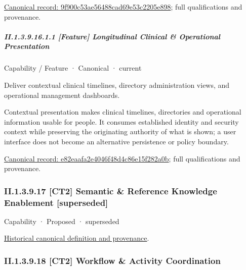 {\footnotesize \href{../../../../continuum/strategy/capability/9f900c53ae56488cad69e53c2205e898.md}{Canonical record: 9f900c53ae56488cad69e53c2205e898}; full qualifications and provenance.}\par
\subparagraph*{II.1.3.9.16.1.1 [Feature] Longitudinal Clinical \& Operational Presentation}
\label{navigation:II.1.3.9.16.1.1}

\label{element:e82eaafa2e4046f48d4c86e15f282a0b}
{\small Capability / Feature · Canonical · current}\par

Deliver contextual clinical timelines, directory administration views, and operational management dashboards.



Contextual presentation makes clinical timelines, directories and operational information usable for people. It consumes established identity and security context while preserving the originating authority of what is shown; a user interface does not become an alternative persistence or policy boundary.


{\footnotesize \href{../../../../continuum/strategy/capability/feature/e82eaafa2e4046f48d4c86e15f282a0b.md}{Canonical record: e82eaafa2e4046f48d4c86e15f282a0b}; full qualifications and provenance.}\par
\subsubsection*{II.1.3.9.17 [CT2] Semantic \& Reference Knowledge Enablement [superseded]}
\label{navigation:II.1.3.9.17}

\label{element:92a71292710c41b29775d19b98c197d6}
{\small Capability · Proposed · superseded}\par
\href{../../../../continuum/strategy/capability/92a71292710c41b29775d19b98c197d6.md}{Historical canonical definition and provenance}.\par
\subsubsection*{II.1.3.9.18 [CT2] Workflow \& Activity Coordination}
\label{navigation:II.1.3.9.18}

